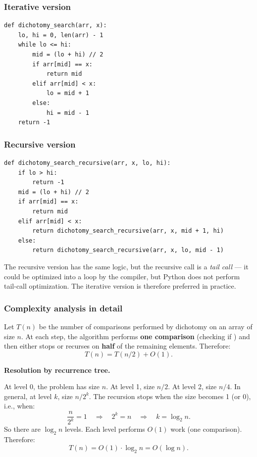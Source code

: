 \documentclass[11pt,a4paper]{article}
\newcommand{\code}[1]{\texttt{\detokenize{#1}}}
\begin{document}
\subsubsection{Iterative version}

\begin{lstlisting}
def dichotomy_search(arr, x):
    lo, hi = 0, len(arr) - 1
    while lo <= hi:
        mid = (lo + hi) // 2
        if arr[mid] == x:
            return mid
        elif arr[mid] < x:
            lo = mid + 1
        else:
            hi = mid - 1
    return -1
\end{lstlisting}

\subsubsection{Recursive version}

\begin{lstlisting}
def dichotomy_search_recursive(arr, x, lo, hi):
    if lo > hi:
        return -1
    mid = (lo + hi) // 2
    if arr[mid] == x:
        return mid
    elif arr[mid] < x:
        return dichotomy_search_recursive(arr, x, mid + 1, hi)
    else:
        return dichotomy_search_recursive(arr, x, lo, mid - 1)
\end{lstlisting}

The recursive version has the same logic, but the recursive call is a \emph{tail call} --- it could be optimized into a loop by the compiler, but Python does not perform tail-call optimization. The iterative version is therefore preferred in practice.

\subsubsection{Complexity analysis in detail}

Let $T(n)$ be the number of comparisons performed by dichotomy on an array of size $n$. At each step, the algorithm performs \textbf{one comparison} (checking if \code{arr[mid] == x}) and then either stops or recurses on \textbf{half} of the remaining elements. Therefore:
\[
T(n) = T(n/2) + O(1).
\]

\textbf{Resolution by recurrence tree.}

At level 0, the problem has size $n$. At level 1, size $n/2$. At level 2, size $n/4$. In general, at level $k$, size $n/2^k$. The recursion stops when the size becomes 1 (or 0), i.e., when:
\[
\frac{n}{2^k} = 1 \quad \Longrightarrow \quad 2^k = n \quad \Longrightarrow \quad k = \log_2 n.
\]
So there are $\log_2 n$ levels. Each level performs $O(1)$ work (one comparison). Therefore:
\[
T(n) = O(1) \cdot \log_2 n = O(\log n).
\]
\end{document}
